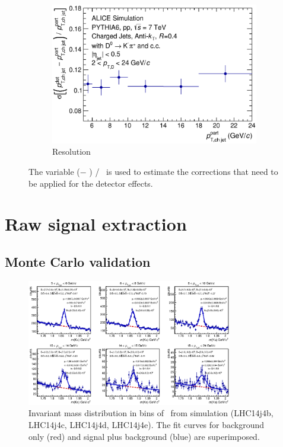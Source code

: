 \begin{figure}[tbh]
\begin{subfigure}{0.49\textwidth}
  \includegraphics[width=1.0\linewidth]{img/HQ16_Simulation_Resolution}
  \caption{Resolution}
  \label{fig:HQ16_Simulation_Resolution}
\end{subfigure}
\caption{The variable (\ptchjetdet $-$ \ptchjetgen) / \ptchjetgen\ is used to estimate the corrections that need to be applied for the detector effects.}
\label{fig:DetectorResponse}
\end{figure}

\section{Raw signal extraction}

\subsection{Monte Carlo validation}
\begin{figure}[tbh]
\begin{center}
\includegraphics[width=0.8\textwidth]{img/D0_JetPtBins_PtD_20}
 \caption{Invariant mass distribution in bins of \ptchjetdet\ from simulation (LHC14j4b, LHC14j4c, LHC14j4d, LHC14j4e). The fit curves for background only (red) and signal plus background (blue) are superimposed.} 
 \label{fig:D0_JetPtBins_PtD_20}
\end{center}
\end{figure}

